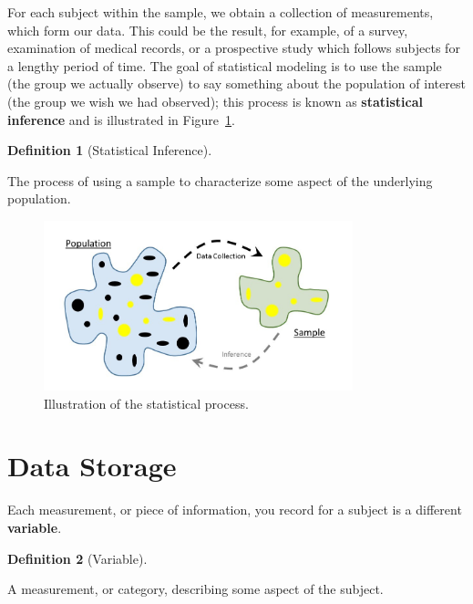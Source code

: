 \documentclass[
  letterpaper,
  DIV=11,
  numbers=noendperiod]{scrreprt}
\theoremstyle{definition}
\theoremstyle{definition}
\newtheorem{definition}{Definition}[chapter]
\theoremstyle{remark}
\begin{document}
For each subject within the sample, we obtain a collection of
measurements, which form our data. This could be the result, for
example, of a survey, examination of medical records, or a prospective
study which follows subjects for a lengthy period of time. The goal of
statistical modeling is to use the sample (the group we actually
observe) to say something about the population of interest (the group we
wish we had observed); this process is known as \textbf{statistical
inference} and is illustrated in
Figure~\ref{fig-statistical-process-statistical-process}.

\begin{definition}[Statistical
Inference]\protect\hypertarget{def-inference}{}\label{def-inference}

The process of using a sample to characterize some aspect of the
underlying population.

\end{definition}

\begin{figure}

{\centering \includegraphics[width=0.8\textwidth,height=\textheight]{images/Statistical-Process-Statistical-Process.jpg}

}

\caption{\label{fig-statistical-process-statistical-process}Illustration
of the statistical process.}

\end{figure}

\hypertarget{data-storage}{%
\section{Data Storage}\label{data-storage}}

Each measurement, or piece of information, you record for a subject is a
different \textbf{variable}.

\begin{definition}[Variable]\protect\hypertarget{def-variable}{}\label{def-variable}

A measurement, or category, describing some aspect of the subject.

\end{definition}
\end{document}
